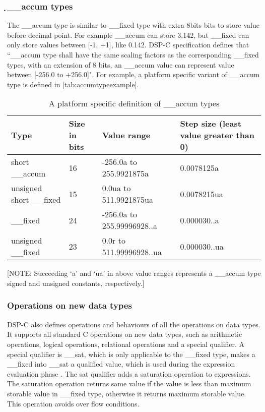 \subsubsection{̣\_\_accum types}
The \_\_accum type is similar to \_\_fixed type with extra 8bits bits to store value before decimal point. For example \_\_accum can store 3.142, but \_\_fixed can only store values between [-1, +1], like 0.142. DSP-C specification \cite{website:dspc:specification} defines that ``\_\_accum type shall have the same scaling factors as the corresponding \_\_fixed types, with an extension of 8 bits, an \_\_accum value can represent value between [-256.0 to +256.0]". For example, a platform specific variant of \_\_accum type is defined in \autoref{tab:accumtypeexample}.

\begin{table}[htbp]
\centering
    \begin{tabular}{ | l | p{0.75cm} | l | p{2cm} |}
    \hline
    \textbf{Type}  & \textbf{Size in bits} & \textbf{Value range} & \textbf{Step size (least value greater than 0)} \\ \hline
    short \_\_accum           & 16    & -256.0a to 255.9921875a  & 0.0078125a \\ \hline
    unsigned short \_\_fixed  & 15    & 0.0ua to 511.9921875ua & 0.0078215ua\\ \hline
    \_\_fixed                 & 24   & -256.0a to 255.99996928..a & 0.000030..a\\ \hline
    unsigned \_\_fixed        & 23   & 0.0r to 511.99996928..ua & 0.000030..ua\\ \hline

    \end{tabular}
\caption{A platform specific definition of \_\_accum types}
[NOTE: Succeeding `a' and `ua' in above value ranges represents a \_\_accum type signed and unsigned constants, respectively.]
\label{tab:accumtypeexample}
\end{table}

\subsubsection{Operations on new data types} 
DSP-C also defines operations and behaviours of all the operations on data types. It supports all standard C operations on new data types, such as arithmetic operations, logical operations, relational operations and a special qualifier. A special qualifier is \_\_sat, which is only applicable to the \_\_fixed type, makes a \_\_fixed into \_\_sat a qualified value, which is used during the expression evaluation phase \cite{website:dspc:specification}. The sat qualifier adds a saturation operation to expressions. The saturation operation returns same value if the value is less than maximum storable value in  \_\_fixed type, otherwise it returns maximum storable value. This operation avoids over flow conditions.


